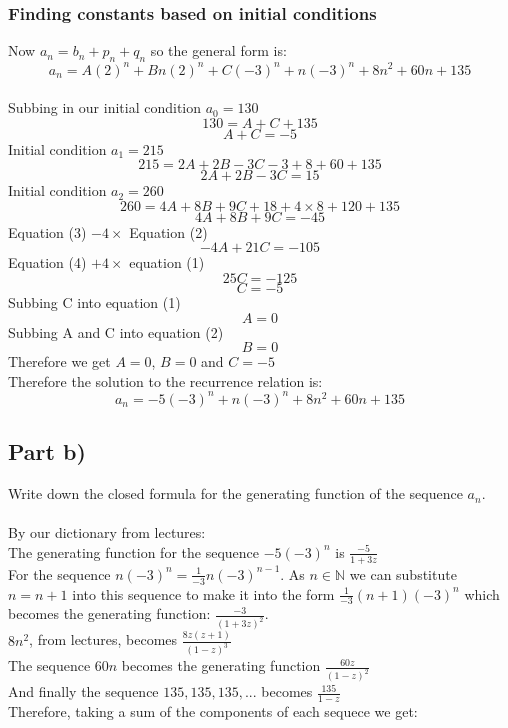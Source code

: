 \documentclass{article}
\begin{document}
\subsubsection*{Finding constants based on initial conditions}

Now $a_n = b_n + p_n + q_n$ so the general form is:
\[ a_n = A(2)^n + Bn(2)^n + C(-3)^n + n(-3)^n + 8n^2 + 60n + 135 \]
\\
Subbing in our initial condition $a_0 = 130$
\[ 130 = A + C + 135 \]
\begin{equation}
  A + C = -5
\end{equation}
Initial condition $a_1 = 215$
\[ 215 = 2A + 2B - 3C -3 + 8 + 60 + 135 \]
\begin{equation}
  2A + 2B - 3C = 15
\end{equation}
Initial condition $a_2 = 260$
\[ 260 = 4A + 8B + 9C + 18 + 4\times8 + 120 + 135 \]
\begin{equation}
  4A + 8B + 9C = -45
\end{equation}
Equation (3) $- 4 \times$ Equation (2)
\begin{equation}
  -4A + 21C = -105
\end{equation}
Equation (4) $+ 4\times$ equation (1)
\[ 25C = -125 \]
\[ C = -5 \]
Subbing C into equation (1)
\[ A = 0 \]
Subbing A and C into equation (2)
\[ B = 0 \]
Therefore we get $A=0$, $B=0$ and $C=-5$
\\
Therefore the solution to the recurrence relation is:
\[ a_n = -5(-3)^n + n(-3)^n + 8n^2 + 60n + 135 \]

\subsection{Part b)}

Write down the closed formula for the generating function of the sequence $a_n$.
\\
\\
By our dictionary from lectures:\\
The generating function for the sequence $-5(-3)^n$ is $\frac{-5}{1+3z}$\\
For the sequence $n(-3)^n = \frac{1}{-3}n(-3)^{n-1}$.  As $n \in \mathbb{N}$ we can substitute $n = n+1$ into this sequence
to make it into the form $\frac{1}{-3}(n+1)(-3)^{n}$ which becomes the generating function: $\frac{-3}{(1+3z)^2}$. \\
$8n^2$, from lectures, becomes $\frac{8z(z+1)}{(1-z)^3}$\\
The sequence $60n$ becomes the generating function $\frac{60z}{(1-z)^2}$ \\
And finally the sequence $135, 135, 135, ...$ becomes $\frac{135}{1-z}$ \\
Therefore, taking a sum of the components of each sequece we get:
\end{document}

